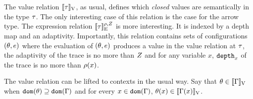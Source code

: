 \documentclass[a4paper,11pt]{article}
\theoremstyle{definition}
\begin{document}

The value relation $[\![ \tau ]\!]_{\text{V}}$, as usual, defines which
\emph{closed} values are semantically in the type $\tau$. The only
interesting case of this relation is the case for the arrow type. The
expression relation $[\![ \tau ]\!]_{\text{E}}^{\rho, Z}$ is more
interesting. It is indexed by a depth map and an
adaptivity. Importantly, this relation contains sets of configurations
$(\theta, e)$ where the evaluation of $(\theta, e)$ produces a
value in the value relation at $\tau$, the adaptivity of the trace is
no more than $Z$ and for any variable $x$, $\mathtt{depth}_{x}$ of the
trace is no more than $\rho(x)$.

The value relation can be lifted to contexts in the usual way. Say
that $\theta \in [\![ \Gamma ]\!]_{\text{V}}$ when $\mathtt{dom}(\theta) \supseteq \mathtt{dom}(\Gamma)$
and for every $x \in \mathtt{dom}(\Gamma)$, $\theta(x) \in [\![ \Gamma(x) ]\!]_{\text{V}}$.
\end{document}
